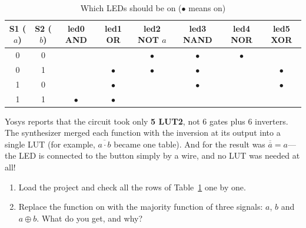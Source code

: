 
\begin{table}[H]
\centering
\caption{Which LEDs should be on ($\bullet$ means on)}
\label{tab:gates}
\begin{tabular}{cc|cccccc}
\toprule
S1 ($a$) & S2 ($b$) & led0 AND & led1 OR & led2 NOT $a$ & led3 NAND & led4 NOR & led5 XOR \\
\midrule
0 & 0 &           &           & $\bullet$ & $\bullet$ & $\bullet$ &           \\
0 & 1 &           & $\bullet$ & $\bullet$ & $\bullet$ &           & $\bullet$ \\
1 & 0 &           & $\bullet$ &           & $\bullet$ &           & $\bullet$ \\
1 & 1 & $\bullet$ & $\bullet$ &           &           &           &           \\
\bottomrule
\end{tabular}
\end{table}

\begin{infobox}
Yosys reports that the circuit took only \textbf{5 LUT2}, not 6 gates
plus 6 inverters. The synthesizer merged each function with the inversion at its output into
a single LUT (for example, $\overline{a\cdot b}$ became one table). And for
 the result was $\overline{\overline{a}} = a$---the LED is connected
to the button simply by a wire, and no LUT was needed at all!
\end{infobox}

\begin{taskbox}
\begin{enumerate}
  \item Load the project and check all the rows of
        Table~\ref{tab:gates} one by one.
  \item Replace the function on  with the majority function of three
        signals: $a$, $b$ and $a \oplus b$. What do you get, and why?
\end{enumerate}
\end{taskbox}

